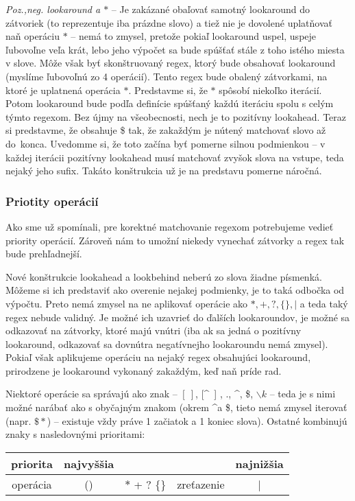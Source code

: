 \textit{Poz.,neg. lookaround a $*$} -- Je zakázané obaľovať samotný lookaround do zátvoriek (to reprezentuje iba prázdne slovo) a tiež nie je dovolené uplatňovať naň operáciu $*$ -- nemá to zmysel, pretože pokiaľ lookaround uspel, uspeje ľubovoľne veľa krát, lebo jeho výpočet sa bude spúšťať stále z toho istého miesta v slove. Môže však byť skonštruovaný regex, ktorý bude obsahovať lookaround (myslíme ľubovoľnú zo 4 operácií). Tento regex bude obalený zátvorkami, na ktoré je uplatnená operácia $*$. Predstavme si, že $*$ spôsobí niekoľko iterácií. Potom lookaround bude podľa definície spúšťaný každú iteráciu spolu s celým týmto regexom. Bez újmy na všeobecnosti, nech je to pozitívny lookahead. Teraz si predstavme, že obsahuje \$ tak, že zakaždým je nútený matchovať slovo až do~konca. Uvedomme si, že toto začína byť pomerne silnou podmienkou -- v každej iterácii pozitívny lookahead musí matchovať zvyšok slova na vstupe, teda nejaký jeho sufix. Takáto konštrukcia už je na predstavu pomerne náročná.

\subsubsection{Priotity operácií}

Ako sme už spomínali, pre korektné matchovanie regexom potrebujeme vedieť priority operácií. Zároveň nám to umožní niekedy vynechať zátvorky a regex tak bude prehľadnejší.

Nové konštrukcie lookahead a lookbehind neberú zo slova žiadne písmenká. Môžeme si ich predstaviť ako overenie nejakej podmienky, je to taká odbočka od výpočtu. Preto nemá zmysel na ne aplikovať operácie ako $*,+,?,\lbrace\rbrace,|$ a teda taký regex nebude validný. Je možné ich uzavrieť do ďalších lookaroundov, je možné sa odkazovať na zátvorky, ktoré majú vnútri (iba ak sa jedná o pozitívny lookaround, odkazovať sa dovnútra negatívnejho lookaroundu nemá zmysel). Pokiaľ však aplikujeme operáciu na nejaký regex obsahujúci lookaround, prirodzene je lookaround vykonaný zakaždým, keď naň príde rad.

Niektoré operácie sa správajú ako znak -- $\left[~\right]$, [\textasciicircum~] , ., \textasciicircum, \$, $\backslash k$ -- teda je s nimi možné narábať ako s obyčajným znakom (okrem \textasciicircum a \$, tieto nemá zmysel iterovať (napr. $\$*$) -- existuje vždy práve 1 začiatok a 1 koniec slova). Ostatné kombinujú znaky s nasledovnými prioritami:
\begin{center}
\begin{tabular}{|c||c|c|c|c|}
\hline
priorita &najvyššia&&& najnižšia  \\
\hline
operácia & () & $*$ + ? $\lbrace \rbrace$ & zreťazenie & | \\ \hline
\end{tabular}
\end{center}

